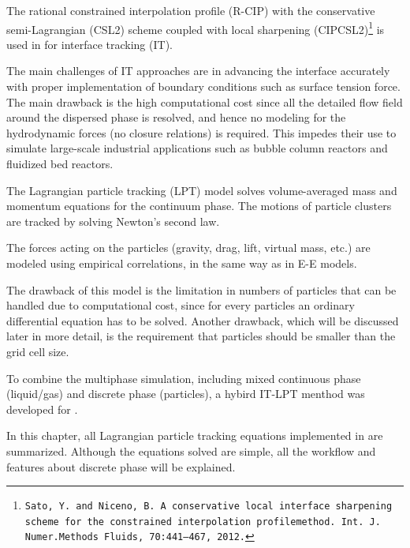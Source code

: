 The rational constrained interpolation profile (R-CIP) with the conservative semi-Lagrangian (CSL2) scheme coupled with local sharpening (CIPCSL2)\footnote{\tt Sato, Y. and Niceno, B. A conservative local interface sharpening scheme for the constrained interpolation profilemethod. Int. J. Numer.Methods Fluids, 70:441–467, 2012.} is used in {\psiboil} for interface tracking (IT).

The main challenges of IT approaches are in advancing the interface accurately with proper implementation of boundary conditions such as surface tension force.  The main drawback is the high computational cost since all the detailed flow field around the dispersed phase is resolved, and hence no modeling for the hydrodynamic forces (no closure relations) is required.  This impedes their use to simulate large-scale industrial applications such as bubble column reactors and fluidized bed reactors.

The Lagrangian particle tracking (LPT) model solves volume-averaged mass and momentum equations for the continuum phase.  The motions of particle clusters are tracked by solving Newton’s second law.

The forces acting on the particles (gravity, drag, lift, virtual mass, etc.) are modeled using empirical correlations, in the same way as in E-E models.

The drawback of this model is the limitation in numbers of particles that can be handled due to computational cost, since for every particles an ordinary differential equation has to be solved.  Another drawback, which will be discussed later in more detail, is the requirement that particles should be smaller than the grid cell size.

To combine the multiphase simulation, including mixed continuous phase (liquid/gas) and discrete phase (particles), a hybird IT-LPT menthod was developed for {\psiboil}.

In this chapter, all Lagrangian particle tracking equations implemented in {\psiboil} are summarized. Although the equations solved are simple, all the workflow and features about discrete phase will be explained.

